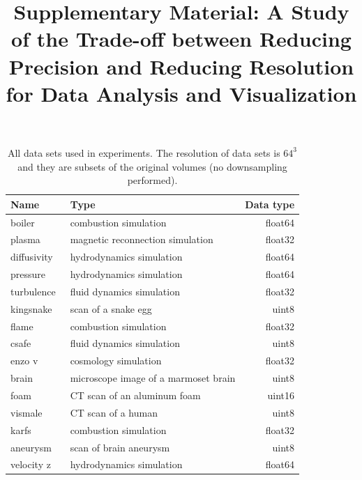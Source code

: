 \documentclass{article}
\title{Supplementary Material: A Study of the Trade-off between Reducing Precision and Reducing Resolution for Data Analysis and Visualization}
\date{}
\begin{document}
\maketitle

\vspace{-3em}
\begin{table}[ht]

        \caption{All data sets used in experiments. The resolution of data sets is $64^3$ and
        they are subsets of the original volumes (no downsampling performed).}
  \centering
  \begin{tabular}{llr}
  \toprule
  Name & Type & Data type \\
  \midrule
  boiler~\cite{boiler} & combustion simulation& float64\\
  plasma~\cite{magnetic} & magnetic reconnection simulation& float32\\
  diffusivity~\cite{cook_cabot_miller_2004} & hydrodynamics simulation& float64\\
  pressure~\cite{cook_cabot_miller_2004} & hydrodynamics simulation& float64\\
  turbulence~\cite{turbulence} & fluid dynamics simulation& float32\\
  kingsnake~\cite{kingsnake} & scan of a snake egg & uint8\\
  flame~\cite{paul_arias} & combustion simulation& float32\\
  csafe & fluid dynamics simulation& uint8\\
  enzo v~\cite{enzo} & cosmology simulation& float32\\
  brain & microscope image of a marmoset brain & uint8\\
  foam~\cite{foam} & CT scan of an aluminum foam & uint16\\
  vismale & CT scan of a human & uint8 \\
  karfs~\cite{HERNANDEZPEREZ2018} & combustion simulation& float32\\
  aneurysm      & scan of brain aneurysm & uint8 \\
  velocity z~\cite{cook_cabot_miller_2004} & hydrodynamics simulation& float64 \\
  \bottomrule
  \end{tabular}\label{tbl:data-sets}
\end{table}
\end{document}
